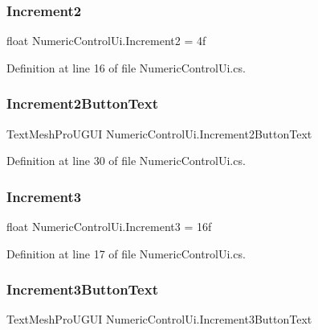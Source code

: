 \subsubsection{\texorpdfstring{Increment2}{Increment2}}
{\footnotesize\ttfamily float Numeric\+Control\+Ui.\+Increment2 = 4f}



Definition at line 16 of file Numeric\+Control\+Ui.\+cs.

\mbox{\label{class_numeric_control_ui_a6fdc9705bbb38673ff8a9db702991d33}} 
\subsubsection{\texorpdfstring{Increment2ButtonText}{Increment2ButtonText}}
{\footnotesize\ttfamily Text\+Mesh\+Pro\+U\+G\+UI Numeric\+Control\+Ui.\+Increment2\+Button\+Text}



Definition at line 30 of file Numeric\+Control\+Ui.\+cs.

\mbox{\label{class_numeric_control_ui_a7566ae406ed71a284164342567eb0094}} 
\subsubsection{\texorpdfstring{Increment3}{Increment3}}
{\footnotesize\ttfamily float Numeric\+Control\+Ui.\+Increment3 = 16f}



Definition at line 17 of file Numeric\+Control\+Ui.\+cs.

\mbox{\label{class_numeric_control_ui_a7ad042c69fd8524be5a24dcfe550dc89}} 
\subsubsection{\texorpdfstring{Increment3ButtonText}{Increment3ButtonText}}
{\footnotesize\ttfamily Text\+Mesh\+Pro\+U\+G\+UI Numeric\+Control\+Ui.\+Increment3\+Button\+Text}



